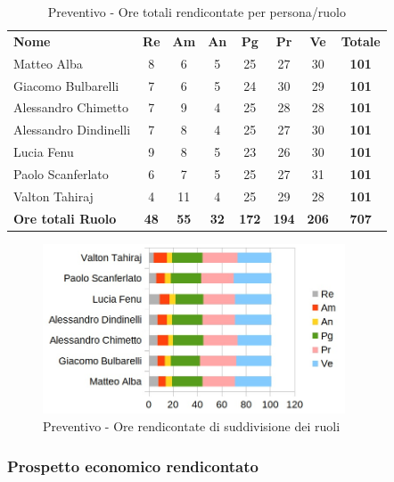		\begin{table} [h!]
			\begin{center}
				\begin{tabular} { m{3.5cm} c c c c c c c }
					\rowcolor{lightgray}
					\textbf{Nome} & \textbf{Re} & \textbf{Am} & \textbf{An} & \textbf{Pg} & \textbf{Pr} & \textbf{Ve} & \textbf{Totale} \\
					Matteo Alba & 8 & 6 & 5 & 25 & 27 & 30 & \textbf{101} \\
					Giacomo Bulbarelli & 7 & 6 & 5 & 24 & 30 & 29 & \textbf{101} \\
					Alessandro Chimetto & 7 & 9 & 4 & 25 & 28 & 28 & \textbf{101} \\
					Alessandro Dindinelli & 7 & 8 & 4 & 25 & 27 & 30 & \textbf{101} \\
					Lucia Fenu & 9 & 8 & 5 & 23 & 26 & 30 & \textbf{101} \\
					Paolo Scanferlato & 6 & 7 & 5 & 25 & 27 & 31 & \textbf{101} \\
					Valton Tahiraj & 4 & 11 & 4 & 25 & 29 & 28 & \textbf{101} \\
					\textbf{Ore totali Ruolo} & \textbf{48} & \textbf{55} & \textbf{32} & \textbf{172} & \textbf{194}& \textbf{206} & \textbf{707}
				\end{tabular}
				\caption{Preventivo - Ore totali rendicontate per persona/ruolo}
			\end{center}
		\end{table}
	
		\begin{figure} [h!]
			\centering
			\includegraphics[width=0.8\textwidth]{res/img/grafici/ore_rendicontate.jpg}
			\caption{Preventivo - Ore rendicontate di suddivisione dei ruoli} 
		\end{figure}
	
	\newpage
	
	\subsubsection{Prospetto economico rendicontato}
	
